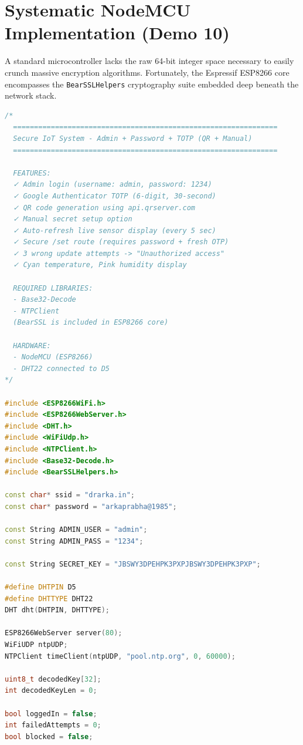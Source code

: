 \section{Systematic NodeMCU Implementation (Demo 10)}
A standard microcontroller lacks the raw 64-bit integer space necessary to easily crunch massive encryption algorithms. Fortunately, the Espressif ESP8266 core encompasses the \texttt{BearSSLHelpers} cryptography suite embedded deep beneath the network stack.

\begin{lstlisting}[language=C++, caption=Demo\_10\_Secure\_IoT\_Admin\_TOTP\_With\_Description.ino]
/*
  ===============================================================
  Secure IoT System - Admin + Password + TOTP (QR + Manual)
  ===============================================================

  FEATURES:
  ✓ Admin login (username: admin, password: 1234)
  ✓ Google Authenticator TOTP (6-digit, 30-second)
  ✓ QR code generation using api.qrserver.com
  ✓ Manual secret setup option
  ✓ Auto-refresh live sensor display (every 5 sec)
  ✓ Secure /set route (requires password + fresh OTP)
  ✓ 3 wrong update attempts -> "Unauthorized access"
  ✓ Cyan temperature, Pink humidity display

  REQUIRED LIBRARIES:
  - Base32-Decode
  - NTPClient
  (BearSSL is included in ESP8266 core)

  HARDWARE:
  - NodeMCU (ESP8266)
  - DHT22 connected to D5
*/

#include <ESP8266WiFi.h>
#include <ESP8266WebServer.h>
#include <DHT.h>
#include <WiFiUdp.h>
#include <NTPClient.h>
#include <Base32-Decode.h>
#include <BearSSLHelpers.h>

const char* ssid = "drarka.in";
const char* password = "arkaprabha@1985";

const String ADMIN_USER = "admin";
const String ADMIN_PASS = "1234";

const String SECRET_KEY = "JBSWY3DPEHPK3PXPJBSWY3DPEHPK3PXP";

#define DHTPIN D5
#define DHTTYPE DHT22
DHT dht(DHTPIN, DHTTYPE);

ESP8266WebServer server(80);
WiFiUDP ntpUDP;
NTPClient timeClient(ntpUDP, "pool.ntp.org", 0, 60000);

uint8_t decodedKey[32];
int decodedKeyLen = 0;

bool loggedIn = false;
int failedAttempts = 0;
bool blocked = false;


\end{lstlisting}
